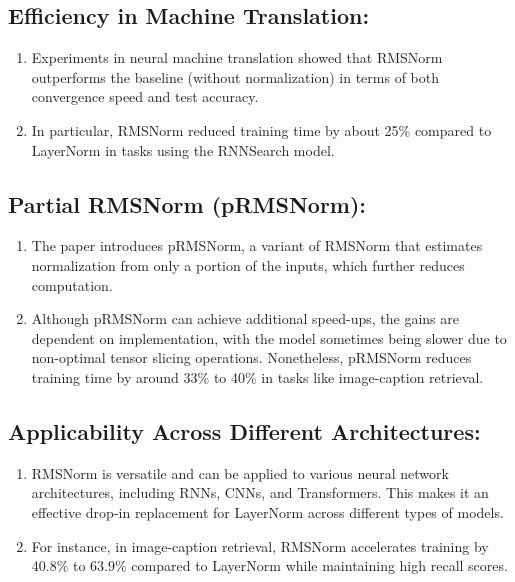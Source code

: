 \documentclass{report}
\begin{document}
	
	\subsection{Efficiency in Machine Translation:}
	\begin{enumerate}
		\item 
		Experiments in neural machine translation showed that RMSNorm outperforms the baseline (without normalization) in terms of both convergence speed and test accuracy.
		
		\item 
		In particular, RMSNorm reduced training time by about 25\% compared to LayerNorm in tasks using the RNNSearch model.
	\end{enumerate}
	
	
	\subsection{Partial RMSNorm (pRMSNorm):}
	\begin{enumerate}
		\item 
		The paper introduces pRMSNorm, a variant of RMSNorm that estimates normalization from only a portion of the inputs, which further reduces computation.
		
		\item 
		Although pRMSNorm can achieve additional speed-ups, the gains are dependent on implementation, with the model sometimes being slower due to non-optimal tensor slicing operations. Nonetheless, pRMSNorm reduces training time by around 33\% to 40\% in tasks like image-caption retrieval.
	\end{enumerate}
	
	
	\subsection{Applicability Across Different Architectures:}
	\begin{enumerate}
		\item 
		RMSNorm is versatile and can be applied to various neural network architectures, including RNNs, CNNs, and Transformers. This makes it an effective drop-in replacement for LayerNorm across different types of models.
		
		\item 
		For instance, in image-caption retrieval, RMSNorm accelerates training by 40.8\% to 63.9\% compared to LayerNorm while maintaining high recall scores.
	\end{enumerate}
	
\end{document}
